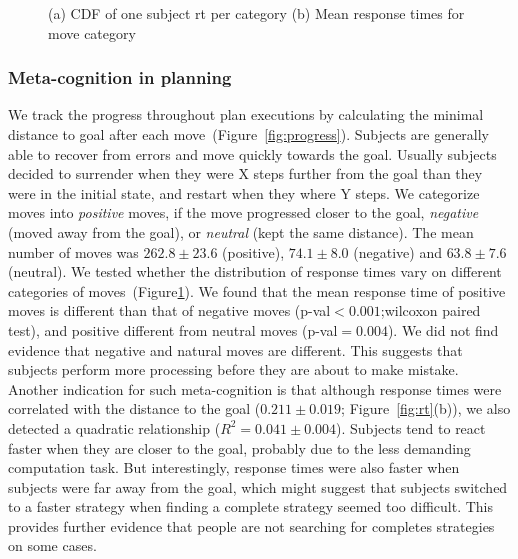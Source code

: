 \documentclass[10pt,letterpaper]{article}
\begin{document}
\begin{figure}[t]
\vspace{-0.5cm}
	\centering
	\vspace{-0.1cm}
	\caption{(a) CDF of one subject rt per category (b) Mean response times for move category} 
	\label{fig:rt_cat}
\vspace{-0.7cm}
\end{figure}
\vspace{-0.1cm}
\subsubsection{Meta-cognition in planning}

We track the progress throughout plan executions by calculating the minimal distance to goal after each move~(Figure~\ref{fig:progress}). Subjects are generally able to recover from errors and move quickly towards the goal. Usually subjects decided to surrender when they were X steps further from the goal than they were in the initial state, and restart when they where Y steps. 
We categorize moves into \emph{positive} moves, if the move progressed closer to the goal, \emph{negative} (moved away from the goal), or \emph{neutral} (kept the same distance). The mean number of moves was $262.8\pm23.6$ (positive), $74.1\pm8.0$ (negative) and $63.8\pm7.6$ (neutral).
We tested whether the distribution of response times vary on different categories of moves~(Figure\ref{fig:rt_cat}). We found that the mean response time of positive moves is different than that of negative moves (p-val$<0.001$;wilcoxon paired test), and positive different from neutral moves (p-val$=0.004$). We did not find evidence that negative and natural moves are different. This suggests that subjects perform more processing before they are about to make mistake. Another indication for such meta-cognition is that although response times were correlated with the distance to the goal ($0.211\pm0.019$; Figure~\ref{fig:rt}(b)), we also detected a quadratic relationship ($R^2=0.041\pm0.004$). Subjects tend to react faster when they are closer to the goal, probably due to the less demanding computation task. But interestingly, response times were also faster when subjects were far away from the goal, which might suggest that subjects switched to a faster strategy when finding a complete strategy seemed too difficult. This provides further evidence that people are not searching for completes strategies on some cases.
\vspace{-0.75cm}
\end{document}

